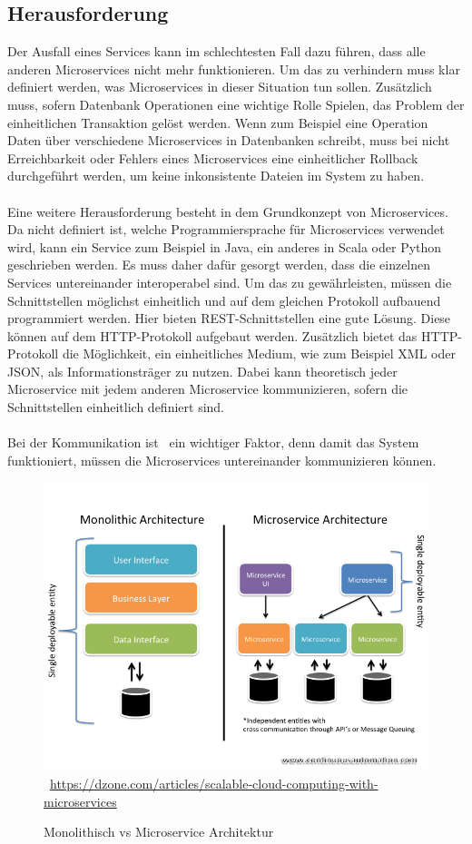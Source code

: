 \subsection{Herausforderung}
\label{sec:Herausforderung}
Der Ausfall eines Services kann im schlechtesten Fall dazu führen, dass alle anderen Microservices nicht mehr funktionieren. Um das zu verhindern muss klar definiert werden, was Microservices in dieser Situation tun sollen. Zusätzlich muss, sofern Datenbank Operationen eine wichtige Rolle Spielen, das Problem der einheitlichen Transaktion gelöst werden. Wenn zum Beispiel eine Operation Daten über verschiedene Microservices in Datenbanken schreibt, muss bei nicht Erreichbarkeit oder Fehlers eines Microservices eine einheitlicher Rollback durchgeführt werden, um keine inkonsistente Dateien im System zu haben.
\\\\
Eine weitere Herausforderung besteht in dem Grundkonzept von Microservices. Da nicht definiert ist, welche Programmiersprache für Microservices verwendet wird, kann ein Service zum Beispiel in Java, ein anderes in Scala oder Python geschrieben werden. Es muss daher dafür gesorgt werden, dass die einzelnen Services untereinander interoperabel sind. Um das zu gewährleisten, müssen die Schnittstellen möglichst einheitlich und auf dem gleichen Protokoll aufbauend programmiert werden. Hier bieten REST-Schnittstellen eine gute Lösung. Diese können auf dem HTTP-Protokoll aufgebaut werden. Zusätzlich bietet das HTTP-Protokoll die Möglichkeit, ein einheitliches Medium, wie zum Beispiel XML oder JSON, als Informationsträger zu nutzen. Dabei kann theoretisch jeder Microservice mit jedem anderen Microservice kommunizieren, sofern die Schnittstellen einheitlich definiert sind.
\\\\
Bei der Kommunikation ist \ ein wichtiger Faktor, denn damit das System funktioniert, müssen die Microservices untereinander kommunizieren können.
\newpage
\begin{figure}[htb]
	\centering 
	\includegraphics[width=\linewidth]{content/images/570495-slide1}\
	\quelle\url{https://dzone.com/articles/scalable-cloud-computing-with-microservices}
	\caption{Monolithisch vs Microservice Architektur\\}
	\label{fig:MonoVSMicroArchitektur} 
\end{figure}
